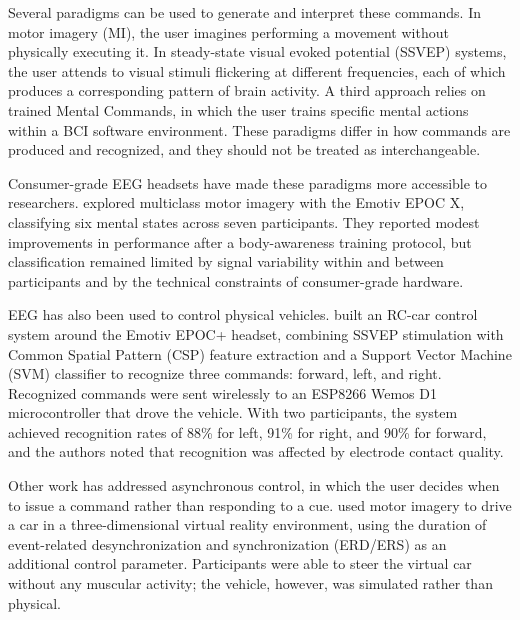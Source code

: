 Several paradigms can be used to generate and interpret these commands. In motor imagery (MI), the user imagines performing a movement without physically executing it. In steady-state visual evoked potential (SSVEP) systems, the user attends to visual stimuli flickering at different frequencies, each of which produces a corresponding pattern of brain activity. A third approach relies on trained Mental Commands, in which the user trains specific mental actions within a BCI software environment. These paradigms differ in how commands are produced and recognized, and they should not be treated as interchangeable.

Consumer-grade EEG headsets have made these paradigms more accessible to researchers. \citet{tarara2025} explored multiclass motor imagery with the Emotiv EPOC X, classifying six mental states across seven participants. They reported modest improvements in performance after a body-awareness training protocol, but classification remained limited by signal variability within and between participants and by the technical constraints of consumer-grade hardware.

EEG has also been used to control physical vehicles. \citet{setiono2018rccar} built an RC-car control system around the Emotiv EPOC+ headset, combining SSVEP stimulation with Common Spatial Pattern (CSP) feature extraction and a Support Vector Machine (SVM) classifier to recognize three commands: forward, left, and right. Recognized commands were sent wirelessly to an ESP8266 Wemos D1 microcontroller that drove the vehicle. With two participants, the system achieved recognition rates of 88\% for left, 91\% for right, and 90\% for forward, and the authors noted that recognition was affected by electrode contact quality.

Other work has addressed asynchronous control, in which the user decides when to issue a command rather than responding to a cue. \citet{zhao2009asynchronous} used motor imagery to drive a car in a three-dimensional virtual reality environment, using the duration of event-related desynchronization and synchronization (ERD/ERS) as an additional control parameter. Participants were able to steer the virtual car without any muscular activity; the vehicle, however, was simulated rather than physical.

